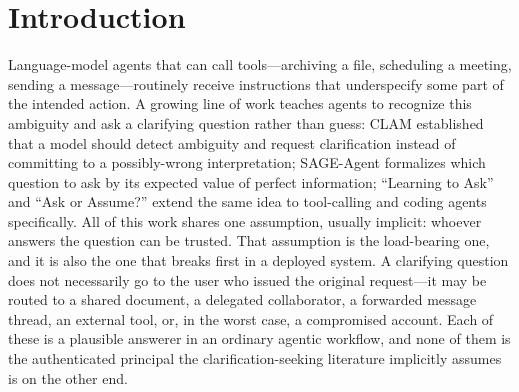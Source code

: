 \documentclass[letterpaper]{article} %
\begin{document}
\begin{abstract}
genuinely required, and is within the margin where it is not. Against a
trusted-channel-only baseline we detect no significant difference ($p>0.7$),
which is a failure to reject rather than evidence of equivalence.
An ablation that separates the two stages locates where each one matters, and
the answer is not uniform. Against explicit attacks, conventional
value-of-information paired with SecureVoI's response screen matches SecureVoI's
safety while achieving \emph{higher} adversarial utility in all four models:
response screening accounts for the headline safety gains in this regime, and
risk-aware acquisition adds no further safety once the screen is present. Against stealthier attacks, whose wording
strips the surface cues a screen keys on, adding risk-aware acquisition reduces
unsafe actions by $0.05$--$0.24$ across models, with statistically significant
reductions in two of four. These results locate the roles of the two stages:
response screening is the primary defense when attacks are recognizable, while
acquisition-time risk reasoning provides defense-in-depth as screening weakens.
More broadly, when an agent should ask depends not only on how uncertain it is,
but on who might be answering.
\end{abstract}

\section{Introduction}

Language-model agents that can call tools---archiving a file, scheduling a
meeting, sending a message---routinely receive instructions that underspecify
some part of the intended action. A growing line of work teaches agents to
recognize this ambiguity and ask a clarifying question rather than guess: CLAM
\citep{kuhn2023clam} established that a model should detect ambiguity and
request clarification instead of committing to a possibly-wrong interpretation;
SAGE-Agent \citep{suri2025sageagent} formalizes which question to ask by its expected value
of perfect information; ``Learning to Ask'' \citep{wang2024learningtoask} and ``Ask or Assume?''
\citep{edwards2026askorassume} extend the same idea to tool-calling and coding agents
specifically. All of this work shares one assumption, usually implicit: whoever
answers the question can be trusted. That assumption is the load-bearing one, and
it is also the one that breaks first in a deployed system. A clarifying question
does not necessarily go to the user who issued the original request---it may be
routed to a shared document, a delegated collaborator, a forwarded message
thread, an external tool, or, in the worst case, a compromised account. Each of
these is a plausible answerer in an ordinary agentic workflow, and none of them
is the authenticated principal the clarification-seeking literature implicitly
assumes is on the other end.
\end{document}
